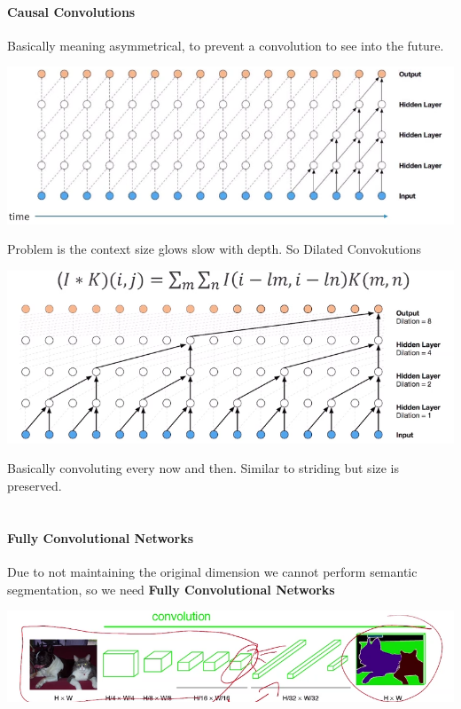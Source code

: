\documentclass[10pt]{report}
\begin{document}
\paragraph{Causal Convolutions} Basically meaning asymmetrical, to prevent a convolution to see into the future.\begin{center}
	\includegraphics[scale=0.5]{70.png}
\end{center}
Problem is the context size glows slow with depth. So Dilated Convokutions
\begin{center}
	\includegraphics[scale=0.5]{71.png}
\end{center}
Basically convoluting every now and then. Similar to striding but size is preserved.\\\\
\paragraph{Fully Convolutional Networks} Due to not maintaining the original dimension we cannot perform semantic segmentation, so we need \textbf{Fully Convolutional Networks}
\begin{center}
	\includegraphics[scale=0.5]{72.png}
\end{center}
\end{document}
